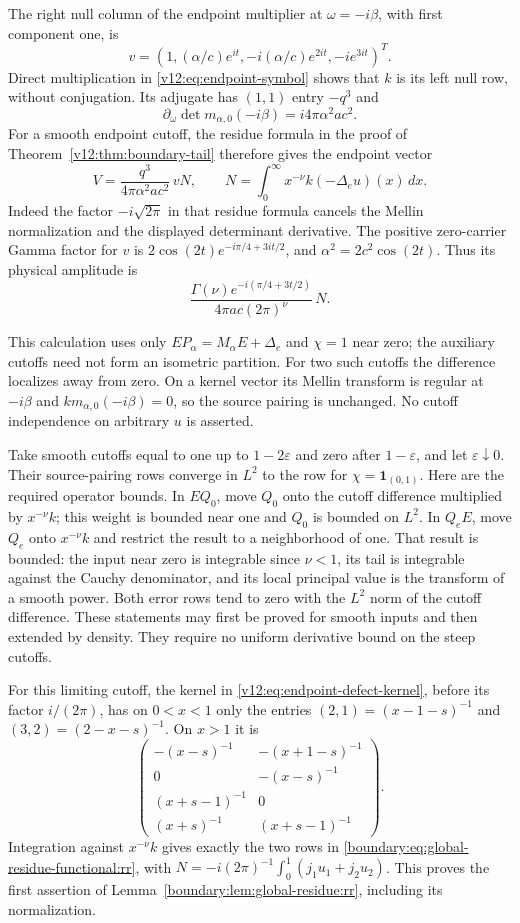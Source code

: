 The right null column of the endpoint multiplier at $\omega=-i\beta$,
with first component one, is
\[
 v=(1,(\alpha/c)e^{it},-i(\alpha/c)e^{2it},-ie^{3it})^T.
\]
Direct multiplication in \eqref{v12:eq:endpoint-symbol} shows that
$k$ is its left null row, without conjugation.  Its adjugate has
$(1,1)$ entry $-q^3$ and
\[
 \partial_\omega\det m_{\alpha,0}(-i\beta)
       =i4\pi\alpha^2ac^2.
\]
For a smooth endpoint cutoff, the residue formula in the proof of
Theorem~\ref{v12:thm:boundary-tail} therefore gives the endpoint vector
\begin{equation}\label{boundary:eq:source-residue-row:rr}
 V=\frac{q^3}{4\pi\alpha^2ac^2}\,vN,\qquad
 N=\int_0^\infty x^{-\nu}k(-\Delta_eu)(x)\,dx.
\end{equation}
Indeed the factor $-i\sqrt{2\pi}$ in that residue formula cancels
the Mellin normalization and the displayed determinant derivative.
The positive zero-carrier Gamma factor for $v$ is
$2\cos(2t)e^{-i\pi/4+3it/2}$, and
$\alpha^2=2c^2\cos(2t)$.  Thus its physical amplitude is
\[
 \frac{\Gamma(\nu)e^{-i(\pi/4+3t/2)}}
      {4\pi ac(2\pi)^\nu}\,N.
\]

This calculation uses only $EP_\alpha=M_\alpha E+\Delta_e$ and
$\chi=1$ near zero; the auxiliary cutoffs need not form an isometric
partition. For two such cutoffs the difference localizes away from
zero. On a kernel vector its Mellin transform is regular at $-i\beta$
and $km_{\alpha,0}(-i\beta)=0$, so the source pairing is unchanged.
No cutoff independence on arbitrary $u$ is asserted.

Take smooth cutoffs equal to one up to $1-2\varepsilon$ and zero
after $1-\varepsilon$, and let $\varepsilon\downarrow0$.
Their source-pairing rows converge in $L^2$ to the row for
$\chi=\mathbf1_{(0,1)}$.  Here are the required operator bounds.
In $EQ_0$, move $Q_0$ onto the cutoff difference multiplied by
$x^{-\nu}k$; this weight is bounded near one and $Q_0$ is bounded
on $L^2$.  In $Q_eE$, move $Q_e$ onto $x^{-\nu}k$ and restrict the
result to a neighborhood of one.  That result is bounded: the input
near zero is integrable since $\nu<1$, its tail is integrable against
the Cauchy denominator, and its local principal value is the transform
of a smooth power.  Both error rows tend to zero with the $L^2$ norm
of the cutoff difference.  These statements may first be proved for
smooth inputs and then extended by density.  They require no uniform
derivative bound on the steep cutoffs.

For this limiting cutoff, the kernel in
\eqref{v12:eq:endpoint-defect-kernel}, before its factor $i/(2\pi)$,
has on $0<x<1$ only the entries
$(2,1)=(x-1-s)^{-1}$ and $(3,2)=(2-x-s)^{-1}$.
On $x>1$ it is
\[
 \begin{pmatrix}
 -(x-s)^{-1}&-(x+1-s)^{-1}\\
 0&-(x-s)^{-1}\\
 (x+s-1)^{-1}&0\\
 (x+s)^{-1}&(x+s-1)^{-1}
 \end{pmatrix}.
\]
Integration against $x^{-\nu}k$ gives exactly the two rows in
\eqref{boundary:eq:global-residue-functional:rr}, with
$N=-i(2\pi)^{-1}\int_0^1(j_1u_1+j_2u_2)$.
This proves the first assertion of
Lemma~\ref{boundary:lem:global-residue:rr}, including its normalization.

